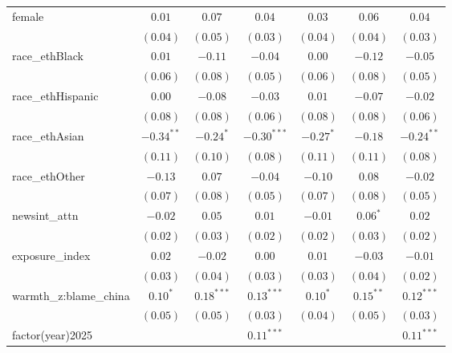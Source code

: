 \begin{tabular}{l c c c c c c}
female                 & $0.01$        & $0.07$       & $0.04$        & $0.03$        & $0.06$       & $0.04$        \\
                       & $(0.04)$      & $(0.05)$     & $(0.03)$      & $(0.04)$      & $(0.04)$     & $(0.03)$      \\
race\_ethBlack         & $0.01$        & $-0.11$      & $-0.04$       & $0.00$        & $-0.12$      & $-0.05$       \\
                       & $(0.06)$      & $(0.08)$     & $(0.05)$      & $(0.06)$      & $(0.08)$     & $(0.05)$      \\
race\_ethHispanic      & $0.00$        & $-0.08$      & $-0.03$       & $0.01$        & $-0.07$      & $-0.02$       \\
                       & $(0.08)$      & $(0.08)$     & $(0.06)$      & $(0.08)$      & $(0.08)$     & $(0.06)$      \\
race\_ethAsian         & $-0.34^{**}$  & $-0.24^{*}$  & $-0.30^{***}$ & $-0.27^{*}$   & $-0.18$      & $-0.24^{**}$  \\
                       & $(0.11)$      & $(0.10)$     & $(0.08)$      & $(0.11)$      & $(0.11)$     & $(0.08)$      \\
race\_ethOther         & $-0.13$       & $0.07$       & $-0.04$       & $-0.10$       & $0.08$       & $-0.02$       \\
                       & $(0.07)$      & $(0.08)$     & $(0.05)$      & $(0.07)$      & $(0.08)$     & $(0.05)$      \\
newsint\_attn          & $-0.02$       & $0.05$       & $0.01$        & $-0.01$       & $0.06^{*}$   & $0.02$        \\
                       & $(0.02)$      & $(0.03)$     & $(0.02)$      & $(0.02)$      & $(0.03)$     & $(0.02)$      \\
exposure\_index        & $0.02$        & $-0.02$      & $0.00$        & $0.01$        & $-0.03$      & $-0.01$       \\
                       & $(0.03)$      & $(0.04)$     & $(0.03)$      & $(0.03)$      & $(0.04)$     & $(0.02)$      \\
warmth\_z:blame\_china & $0.10^{*}$    & $0.18^{***}$ & $0.13^{***}$  & $0.10^{*}$    & $0.15^{**}$  & $0.12^{***}$  \\
                       & $(0.05)$      & $(0.05)$     & $(0.03)$      & $(0.04)$      & $(0.05)$     & $(0.03)$      \\
factor(year)2025       &               &              & $0.11^{***}$  &               &              & $0.11^{***}$  \\

\end{tabular}
